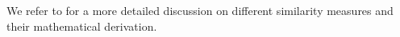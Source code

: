 		We refer to \cite{warrensUnderstandingAdjustedRand2022} for a more detailed discussion on different similarity measures and their mathematical derivation.

